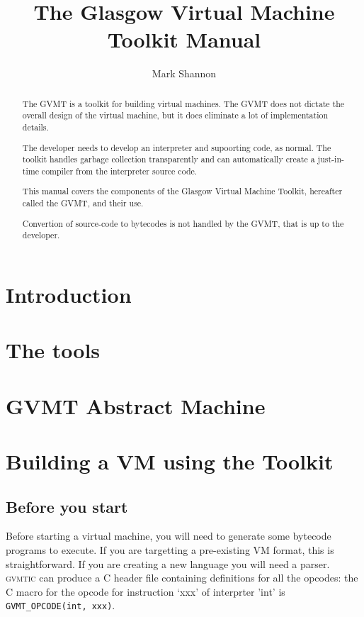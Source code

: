 \documentclass[a4paper,12pt]{report}
\title{The Glasgow Virtual Machine Toolkit Manual}
\author{Mark Shannon}
\date{ }
\newcommand{\gvmtic}{\textsc{gvmtic}}
\begin{document}
\maketitle 

\begin{abstract}
The GVMT is a toolkit for building virtual machines. The GVMT does not dictate the overall design of the virtual machine, but it does eliminate a lot of implementation details. 

The developer needs to develop an interpreter and supoorting code, as normal. The toolkit handles garbage collection transparently
and can automatically create a just-in-time compiler from the interpreter source code.

This manual covers the components of the Glasgow Virtual Machine Toolkit, hereafter called the GVMT, and their use. 

Convertion of source-code to bytecodes is not handled by the GVMT, that is up to the developer.

\tableofcontents

\end{abstract}


\chapter{Introduction}



\chapter{The tools\label{chap:tools}}



\chapter{GVMT Abstract Machine\label{chap:abstract}}



\chapter{Building a VM using the Toolkit}

\section{Before you start}
Before starting a virtual machine, you will need to generate some bytecode programs to execute. If you are targetting a pre-existing VM format, this is straightforward. If you are creating a new language you will need a parser. \gvmtic{} can produce a C header file containing definitions for all the opcodes: the C macro for the opcode for instruction `xxx' of interprter 'int' is \verb|GVMT_OPCODE(int, xxx)|.
\end{document}
